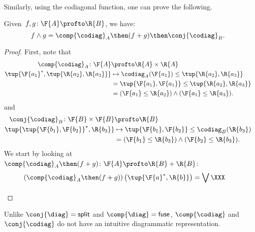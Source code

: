 Similarly, using the codiagonal function, one can prove the following.
\begin{lemma}
    Given~$f, g\colon \F{A} \profto \R{B}$, we have:
    \begin{equation}
        f \wedge g = \comp{\codiag}_A \then(f + g) \then \conj{\codiag}_B.
    \end{equation}
\end{lemma}
\begin{proof}
    First, note that
    \begin{equation}
        \begin{aligned}
            \comp{\codiag}_A \colon \F{A}&\profto \R{A}\times \R{A}\\
            \tup{\F{a_1}^*,\tup{\R{a_2},\R{a_3}}}&\mapsto \codiag_A(\F{a_1})\leq \tup{\R{a_2},\R{a_3}}\\
            &= \tup{\F{a_1},\F{a_1}}\leq \tup{\R{a_2},\R{a_3}}\\
            &= (\F{a_1}\leq \R{a_2}) \wedge (\F{a_1}\leq \R{a_3}).
        \end{aligned}
    \end{equation}
    and
    \begin{equation}
        \begin{aligned}
            \conj{\codiag}_B \colon \F{B}\times \F{B}&\profto \R{B}\\
            \tup{\tup{\F{b_1},\F{b_2}}^*,\R{b_3}}&\mapsto \tup{\F{b_1},\F{b_2}}\leq \codiag_B(\R{b_3})\\
            &= (\F{b_1}\leq \R{b_3}) \wedge (\F{b_2}\leq \R{b_3}).
        \end{aligned}
    \end{equation}
    We start by looking at $\comp{\codiag}_A \then (f+g) \colon \F{A}\profto \R{B}+\R{B}$:
    \begin{equation}
        \begin{aligned}
            \left(\comp{\codiag}_A\then (f+g)\right)\left(\tup{\F{a}^*,\R{b}}\right)&=\bigvee_{} \XXX
        \end{aligned}
    \end{equation}
\end{proof}
Unlike $\conj{\diag} = \mathsf{split}$ and $\comp{\diag} = \mathsf{fuse}$, $\comp{\codiag}$ and $\conj{\codiag}$ do not have an intuitive diagrammatic representation.
